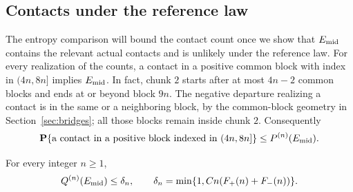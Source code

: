 \subsection{Contacts under the reference law}

The entropy comparison will bound the contact count once we show that
\(E_{\rm mid}\) contains the relevant actual contacts and is unlikely
under the reference law.
For every realization of the counts, a contact in a positive common block
with index in \((4n,8n]\) implies \(E_{\rm mid}\).  In fact, chunk \(2\)
starts after at most \(4n-2\) common blocks and ends at or beyond block
\(9n\).  The negative departure realizing a contact is in the same or a
neighboring block, by the common-block geometry in
Section~\ref{sec:bridges}; all those blocks remain inside chunk \(2\).
Consequently
\begin{equation}
 \mathbf P\{\text{a contact in a positive block indexed in }(4n,8n]\}
 \le P^{(n)}(E_{\rm mid}).
 \label{eq:middle-contact-inclusion}
\end{equation}

\begin{proposition}\label{prop:reference-contact}
For every integer \(n\ge1\),
\begin{equation}
 Q^{(n)}(E_{\rm mid})\le\delta_n,
 \qquad
 \delta_n=\min\{1,Cn(F_+(n)+F_-(n))\}.
 \label{eq:reference-contact}
\end{equation}
\end{proposition}

